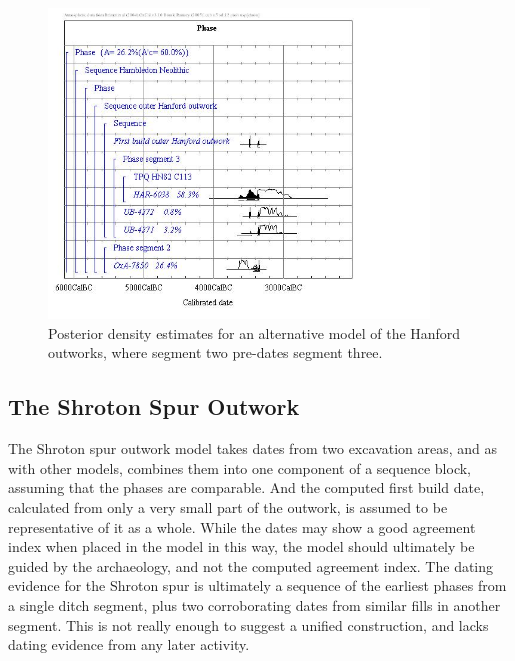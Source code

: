 \begin{figure}
\centering
	\includegraphics[width=0.9\textwidth]{figures/hanford-remodelled}
  \caption{Posterior density estimates for an alternative model of the Hanford outworks, where segment two pre-dates segment three.}
  \label{fig:hanford-remodelled}
\end{figure}

\subsection{The Shroton Spur Outwork}
The Shroton spur outwork model takes dates from two excavation areas, and as with other models, combines them into one component of a sequence block, assuming that the phases are comparable. And the computed first build date, calculated from only a very small part of the outwork, is assumed to be representative of it as a whole. While the dates may show a good agreement index when placed in the model in this way, the model should ultimately be guided by the archaeology, and not the computed agreement index. The dating evidence for the Shroton spur is ultimately a sequence of the earliest phases from a single ditch segment, plus two corroborating dates from similar fills in another segment. This is not really enough to suggest a unified construction, and lacks dating evidence from any later activity.

